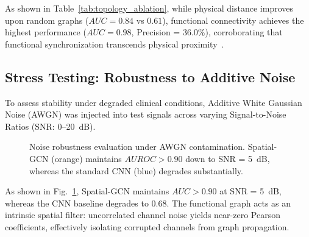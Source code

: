 \documentclass[journal]{IEEEtran}
\begin{document}
As shown in Table~\ref{tab:topology_ablation}, while physical distance improves upon random graphs ($AUC = 0.84$ vs $0.61$), functional connectivity achieves the highest performance ($AUC = 0.98$, Precision = $36.0\%$), corroborating that functional synchronization transcends physical proximity~\cite{bronstein, kramer}.

\subsection{Stress Testing: Robustness to Additive Noise}
To assess stability under degraded clinical conditions, Additive White Gaussian Noise (AWGN) was injected into test signals across varying Signal-to-Noise Ratios (SNR: 0--20~dB).

\begin{figure}[htbp]
\centering
{}
\caption{Noise robustness evaluation under AWGN contamination. Spatial-GCN (orange) maintains $AUROC > 0.90$ down to SNR = 5~dB, whereas the standard CNN (blue) degrades substantially.}
\label{fig:noise}
\end{figure}

As shown in Fig.~\ref{fig:noise}, Spatial-GCN maintains $AUC > 0.90$ at SNR = 5~dB, whereas the CNN baseline degrades to 0.68. The functional graph acts as an intrinsic spatial filter: uncorrelated channel noise yields near-zero Pearson coefficients, effectively isolating corrupted channels from graph propagation.
\end{document}
